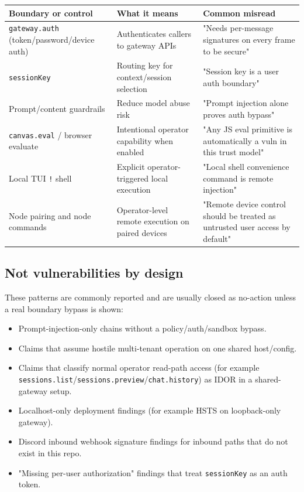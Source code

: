 \begin{table}[h]
\centering
\small
\begin{tabular}{|l|l|l|}
\hline
Boundary or control & What it means & Common misread \\
\hline
\texttt{gateway.auth} (token/password/device auth) & Authenticates callers to gateway APIs & "Needs per-message signatures on every frame to be secure" \\
\hline
\texttt{sessionKey} & Routing key for context/session selection & "Session key is a user auth boundary" \\
\hline
Prompt/content guardrails & Reduce model abuse risk & "Prompt injection alone proves auth bypass" \\
\hline
\texttt{canvas.eval} / browser evaluate & Intentional operator capability when enabled & "Any JS eval primitive is automatically a vuln in this trust model" \\
\hline
Local TUI \texttt{!} shell & Explicit operator-triggered local execution & "Local shell convenience command is remote injection" \\
\hline
Node pairing and node commands & Operator-level remote execution on paired devices & "Remote device control should be treated as untrusted user access by default" \\
\hline
\end{tabular}
\end{table}



\subsection{Not vulnerabilities by design}


These patterns are commonly reported and are usually closed as no-action unless a real boundary bypass is shown:

\begin{itemize}
  \item Prompt-injection-only chains without a policy/auth/sandbox bypass.
  \item Claims that assume hostile multi-tenant operation on one shared host/config.
  \item Claims that classify normal operator read-path access (for example \texttt{sessions.list}/\texttt{sessions.preview}/\texttt{chat.history}) as IDOR in a shared-gateway setup.
  \item Localhost-only deployment findings (for example HSTS on loopback-only gateway).
  \item Discord inbound webhook signature findings for inbound paths that do not exist in this repo.
  \item "Missing per-user authorization" findings that treat \texttt{sessionKey} as an auth token.
\end{itemize}



